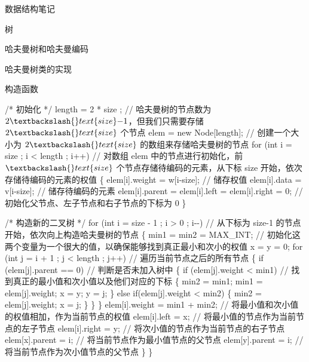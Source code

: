 \documentclass[
  ignorenonframetext,
]{beamer}
\newenvironment{Shaded}{}{}
\newcommand{\NormalTok}[1]{#1}
\begin{document}
\begin{frame}[fragile]{数据结构笔记}
\begin{block}{树}
\begin{block}{哈夫曼树和哈夫曼编码}
\begin{block}{哈夫曼树类的实现}
\begin{block}{构造函数}
\begin{Shaded}
\begin{Highlighting}[]
\NormalTok{  /* 初始化 */    }
\NormalTok{  length = 2 * size ;                                            // 哈夫曼树的节点数为 $2\textbackslash{}text\{size\}{-}1$，但我们只需要存储 $2\textbackslash{}text\{size\}$ 个节点}
\NormalTok{  elem = new Node[length];                                       // 创建一个大小为 $2\textbackslash{}text\{size\}$ 的数组来存储哈夫曼树的节点}
\NormalTok{  for (int i = size ; i \textless{} length ; i++)                          // 对数组 \textasciigrave{}elem\textasciigrave{} 中的节点进行初始化，前 $\textbackslash{}text\{size\}$ 个节点存储待编码的元素，从下标 \textasciigrave{}size\textasciigrave{} 开始，依次存储待编码的元素的权值}
\NormalTok{  \{}
\NormalTok{    elem[i].weight = w[i{-}size]; // 储存权值}
\NormalTok{    elem[i].data = v[i{-}size]; // 储存待编码的元素}
\NormalTok{    elem[i].parent = elem[i].left = elem[i].right = 0;           // 初始化父节点、左子节点和右子节点的下标为 \textasciigrave{}0\textasciigrave{}}
\NormalTok{  \}}

\NormalTok{  /* 构造新的二叉树 */}
\NormalTok{  for (int i = size {-} 1 ; i \textgreater{} 0 ; i{-}{-})                           // 从下标为 \textasciigrave{}size{-}1\textasciigrave{} 的节点开始，依次向上构造哈夫曼树的节点}
\NormalTok{  \{}
\NormalTok{    min1 = min2 = MAX\_INT;                                       // 初始化这两个变量为一个很大的值，以确保能够找到真正最小和次小的权值}
\NormalTok{    x = y = 0;}
\NormalTok{    for (int j = i + 1 ; j \textless{} length ; j++)                       // 遍历当前节点之后的所有节点}
\NormalTok{    \{}
\NormalTok{      if (elem[j].parent == 0)                                   // 判断是否未加入树中}
\NormalTok{      \{}
\NormalTok{        if (elem[j].weight \textless{} min1)                               // 找到真正的最小值和次小值以及他们对应的下标}
\NormalTok{        \{}
\NormalTok{          min2 = min1;}
\NormalTok{          min1 = elem[j].weight;}
\NormalTok{          x = y;}
\NormalTok{          y = j;}
\NormalTok{        \}}
\NormalTok{        else if(elem[j].weight \textless{} min2)}
\NormalTok{        \{}
\NormalTok{          min2 = elem[j].weight;}
\NormalTok{          x = j;}
\NormalTok{        \}}
\NormalTok{      \}}
\NormalTok{    \}}
\NormalTok{    elem[i].weight = min1 + min2;                                // 将最小值和次小值的权值相加，作为当前节点的权值}
\NormalTok{    elem[i].left = x;                                            // 将最小值的节点作为当前节点的左子节点}
\NormalTok{    elem[i].right = y;                                           // 将次小值的节点作为当前节点的右子节点}
\NormalTok{    elem[x].parent = i;                                          // 将当前节点作为最小值节点的父节点}
\NormalTok{    elem[y].parent = i;                                          // 将当前节点作为次小值节点的父节点}
\NormalTok{  \}}
\NormalTok{\}}
\end{Highlighting}
\end{Shaded}
\end{block}


\end{block}
\end{block}
\end{block}
\end{frame}
\end{document}
